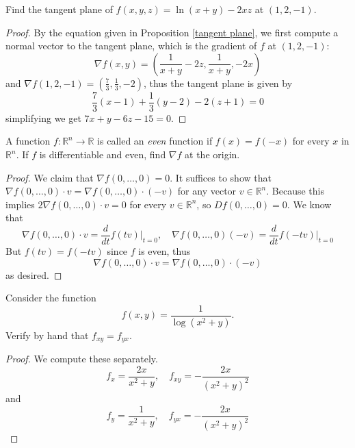 \documentclass[openany]{book}
\newcommand{\R}{\mathbb{R}}
\begin{document}
\begin{prob}
    Find the tangent plane of $f(x,y,z)=\ln(x+y)-2xz$ at $(1,2,-1)$.
\end{prob}
\begin{proof}
    By the equation given in Proposition \ref{tangent plane}, we first compute a normal vector to the tangent plane, which is the gradient of $f$ at $(1,2,-1)$:
    \begin{equation*}
        \nabla f(x,y)=\left(\frac{1}{x+y}-2z, \frac{1}{x+y}, -2x\right)
    \end{equation*}
    and $\nabla f(1,2, -1)=\left(\frac{7}{3}, \frac{1}{3}, -2\right)$, thus the tangent plane is given by 
    \begin{equation*}
        \frac{7}{3}(x-1)+\frac{1}{3}(y-2)-2(z+1)=0
    \end{equation*}
    simplifying we get $7x+y-6z-15=0$.
\end{proof}


\begin{prob}
    A function $f\colon\R^n\to\R$ is called an \textit{even} function if $f(x)=f(-x)$ for every $x$ in $\R^n$. If $f$ is differentiable and even, find $\nabla f$ at the origin.
\end{prob}
\begin{proof}
    We claim that $\nabla f(0,\dots,0)=0$. It suffices to show that $\nabla f(0,\dots, 0)\cdot v=\nabla f(0, \dots, 0)\cdot (-v)$ for any vector $v\in\R^n$. Because this implies $2\nabla f(0,\dots, 0)\cdot v=0$ for every $v\in\R^n$, so $Df(0,\dots, 0)=0$.
    We know that
    \[\nabla f(0,\dots, 0)\cdot v=\frac d{dt}f(tv)\bigg|_{t=0}, \quad \nabla f(0,\dots, 0)(-v)=\frac d{dt}f(-tv)\bigg|_{t=0}\]
    But $f(tv)=f(-tv)$ since $f$ is even, thus 
    \begin{equation*}
        \nabla f(0,\dots, 0)\cdot v=\nabla f(0,\dots, 0)\cdot (-v)
    \end{equation*}
    as desired.
\end{proof}



\begin{prob}
    Consider the function
    \[f(x,y)=\frac1{\log(x^2+y)}.\]
    Verify by hand that $f_{xy}=f_{yx}$.
\end{prob}
\begin{proof}
    We compute these separately.
    \begin{equation*}
        f_x=\frac{2x}{x^2+y}, \quad f_{xy}=-\frac{2x}{\left(x^2+y\right)^2}
    \end{equation*}
    and 
    \begin{equation*}
        f_y=\frac1{x^2+y}, \quad f_{yx}=-\frac{2x}{\left(x^2+y\right)^2}
    \end{equation*}
\end{proof}
\end{document}

